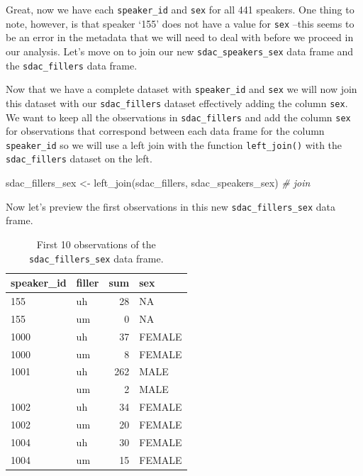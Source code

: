 \documentclass[
  letterpaper,
]{latex/krantz}
\newenvironment{Shaded}{\begin{snugshade}}{\end{snugshade}}
\newcommand{\CommentTok}[1]{\textcolor[rgb]{0.00,0.00,0.00}{\textit{#1}}}
\newcommand{\FunctionTok}[1]{\textcolor[rgb]{0.00,0.00,0.00}{#1}}
\newcommand{\NormalTok}[1]{\textcolor[rgb]{0.00,0.00,0.00}{#1}}
\newcommand{\OtherTok}[1]{\textcolor[rgb]{0.00,0.00,0.00}{#1}}
\begin{document}
Great, now we have each \texttt{speaker\_id} and \texttt{sex} for all
441 speakers. One thing to note, however, is that speaker `155' does not
have a value for \texttt{sex} --this seems to be an error in the
metadata that we will need to deal with before we proceed in our
analysis. Let's move on to join our new \texttt{sdac\_speakers\_sex}
data frame and the \texttt{sdac\_fillers} data frame.

Now that we have a complete dataset with \texttt{speaker\_id} and
\texttt{sex} we will now join this dataset with our
\texttt{sdac\_fillers} dataset effectively adding the column
\texttt{sex}. We want to keep all the observations in
\texttt{sdac\_fillers} and add the column \texttt{sex} for observations
that correspond between each data frame for the column
\texttt{speaker\_id} so we will use a left join with the function
\texttt{left\_join()} with the \texttt{sdac\_fillers} dataset on the
left.

\begin{Shaded}
\begin{Highlighting}[]
\NormalTok{sdac\_fillers\_sex }\OtherTok{\textless{}{-}} 
  \FunctionTok{left\_join}\NormalTok{(sdac\_fillers, sdac\_speakers\_sex) }\CommentTok{\# join}
\end{Highlighting}
\end{Shaded}

Now let's preview the first observations in this new
\texttt{sdac\_fillers\_sex} data frame.

\hypertarget{tbl-i-multi-cont-sdac-fillers-sex-preview}{}
\begin{table}
\caption{\label{tbl-i-multi-cont-sdac-fillers-sex-preview}First 10 observations of the \texttt{sdac\_fillers\_sex} data frame. }\tabularnewline

\centering
\begin{tabular}{llrl}
\toprule
speaker\_id & filler & sum & sex\\
\midrule
155 & uh & 28 & NA\\
155 & um & 0 & NA\\
1000 & uh & 37 & FEMALE\\
1000 & um & 8 & FEMALE\\
1001 & uh & 262 & MALE\\
\addlinespace
1001 & um & 2 & MALE\\
1002 & uh & 34 & FEMALE\\
1002 & um & 20 & FEMALE\\
1004 & uh & 30 & FEMALE\\
1004 & um & 15 & FEMALE\\
\bottomrule
\end{tabular}
\end{table}
\end{document}
